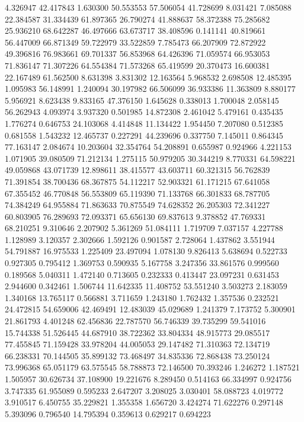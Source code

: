 4.326947
42.417843
1.630300
50.553553
57.506054
41.728699
8.031421
7.085088
22.384587
31.334439
61.897365
26.790274
41.888637
58.372388
75.285682
25.936210
68.642287
46.497666
63.673717
38.408596
0.141141
40.819661
56.447009
66.871349
59.722979
33.522859
7.785473
66.207909
72.872922
49.396816
76.983661
69.701337
56.853968
64.426396
71.059574
66.953053
71.836147
71.307226
64.554384
71.573268
65.419599
20.370473
16.600381
22.167489
61.562500
8.631398
3.831302
12.163564
5.968532
2.698508
12.485395
1.095983
56.148991
1.240094
30.197982
66.506099
36.933386
11.363809
8.880177
5.956921
8.623438
9.833165
47.376150
1.645628
0.338013
1.700048
2.058145
56.262943
4.093974
3.937320
0.501985
14.872308
2.461042
5.479161
0.435435
1.776274
0.646753
24.103068
4.414848
11.134422
1.954450
7.207080
0.512385
0.681558
1.543232
12.465737
0.227291
44.239696
0.337750
7.145011
0.864345
77.163147
2.084674
10.203604
32.354764
54.208891
0.655987
0.924966
4.221153
1.071905
39.080509
71.212134
1.275115
50.979205
30.344219
8.770331
64.598221
49.059868
43.071739
12.898611
38.415577
43.603711
60.321315
56.762839
71.391854
38.700436
68.367875
54.112217
52.903321
61.171215
67.641058
67.355452
46.770848
56.553809
65.119390
71.133768
66.301833
68.787705
74.384249
64.955884
71.863633
70.875549
74.628352
26.205303
72.341227
60.803905
76.289693
72.093371
65.656130
69.837613
9.378852
47.769331
68.210251
9.310646
2.207902
5.361269
51.084111
1.719709
7.037157
4.227788
1.128989
3.120357
2.302666
1.592126
0.901587
2.728064
1.437862
3.551944
54.791887
16.975533
1.225409
23.497094
1.078130
9.826413
5.638694
0.522733
0.927305
0.795412
1.369753
0.590935
5.167758
3.247356
33.861576
0.999560
0.189568
5.040311
1.472140
0.713605
0.232333
0.413447
23.097231
0.631453
2.944600
0.342461
1.506744
11.642335
11.408752
53.551240
3.503273
2.183059
1.340168
13.765117
0.566881
3.711659
1.243180
1.762432
1.357536
0.232521
24.472815
54.659006
42.469491
12.483039
45.029689
1.241379
7.173752
5.300901
21.861793
4.401248
62.456836
22.787570
56.746339
39.735299
59.541016
15.744338
51.526445
44.687910
38.722362
33.804334
48.915773
29.085517
77.455845
71.159428
33.978204
44.005053
29.147482
71.310363
72.134719
66.238331
70.144505
35.899132
73.468497
34.835336
72.868438
73.250124
73.996368
65.051179
63.575545
58.788873
72.146500
70.393246
1.246272
1.187521
1.505957
30.626734
37.108900
19.221676
8.289450
0.514163
66.334997
0.924756
3.747335
61.955089
0.595233
2.647207
3.208025
3.030401
58.088723
4.019772
3.910517
6.450755
35.229821
1.355358
1.656720
3.424274
71.622276
0.297148
5.393096
0.796540
14.795394
0.359613
0.629217
0.694223
